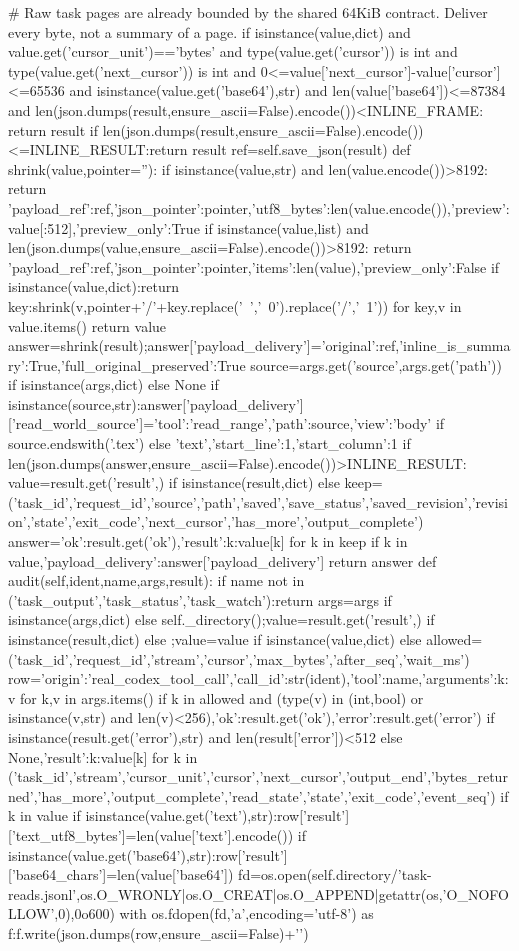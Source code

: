   # Raw task pages are already bounded by the shared 64KiB contract. Deliver every byte, not a summary of a page.
  if isinstance(value,dict) and value.get('cursor_unit')=='bytes' and type(value.get('cursor')) is int and type(value.get('next_cursor')) is int and 0<=value['next_cursor']-value['cursor']<=65536 and isinstance(value.get('base64'),str) and len(value['base64'])<=87384 and len(json.dumps(result,ensure_ascii=False).encode())<INLINE_FRAME:
   return result
  if len(json.dumps(result,ensure_ascii=False).encode())<=INLINE_RESULT:return result
  ref=self.save_json(result)
  def shrink(value,pointer=''):
   if isinstance(value,str) and len(value.encode())>8192:
    return {'payload_ref':ref,'json_pointer':pointer,'utf8_bytes':len(value.encode()),'preview':value[:512],'preview_only':True}
   if isinstance(value,list) and len(json.dumps(value,ensure_ascii=False).encode())>8192:
    return {'payload_ref':ref,'json_pointer':pointer,'items':len(value),'preview_only':False}
   if isinstance(value,dict):return {key:shrink(v,pointer+'/'+key.replace('~','~0').replace('/','~1')) for key,v in value.items()}
   return value
  answer=shrink(result);answer['payload_delivery']={'original':ref,'inline_is_summary':True,'full_original_preserved':True}
  source=args.get('source',args.get('path')) if isinstance(args,dict) else None
  if isinstance(source,str):answer['payload_delivery']['read_world_source']={'tool':'read_range','path':source,'view':'body' if source.endswith('.tex') else 'text','start_line':1,'start_column':1}
  if len(json.dumps(answer,ensure_ascii=False).encode())>INLINE_RESULT:
   value=result.get('result',{}) if isinstance(result,dict) else {}
   keep=('task_id','request_id','source','path','saved','save_status','saved_revision','revision','state','exit_code','next_cursor','has_more','output_complete')
   answer={'ok':result.get('ok'),'result':{k:value[k] for k in keep if k in value},'payload_delivery':answer['payload_delivery']}
  return answer
 def audit(self,ident,name,args,result):
  if name not in ('task_output','task_status','task_watch'):return
  args=args if isinstance(args,dict) else {}
  self._directory();value=result.get('result',{}) if isinstance(result,dict) else {};value=value if isinstance(value,dict) else {}
  allowed=('task_id','request_id','stream','cursor','max_bytes','after_seq','wait_ms')
  row={'origin':'real_codex_tool_call','call_id':str(ident),'tool':name,'arguments':{k:v for k,v in args.items() if k in allowed and (type(v) in (int,bool) or isinstance(v,str) and len(v)<256)},'ok':result.get('ok'),'error':result.get('error') if isinstance(result.get('error'),str) and len(result['error'])<512 else None,'result':{k:value[k] for k in ('task_id','stream','cursor_unit','cursor','next_cursor','output_end','bytes_returned','has_more','output_complete','read_state','state','exit_code','event_seq') if k in value}}
  if isinstance(value.get('text'),str):row['result']['text_utf8_bytes']=len(value['text'].encode())
  if isinstance(value.get('base64'),str):row['result']['base64_chars']=len(value['base64'])
  fd=os.open(self.directory/'task-reads.jsonl',os.O_WRONLY|os.O_CREAT|os.O_APPEND|getattr(os,'O_NOFOLLOW',0),0o600)
  with os.fdopen(fd,'a',encoding='utf-8') as f:f.write(json.dumps(row,ensure_ascii=False)+'\n')


